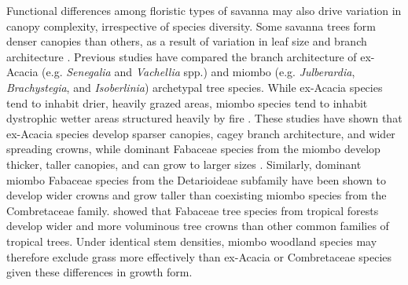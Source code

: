 \documentclass[11pt,a4paper]{article}
\begin{document}
Functional differences among floristic types of savanna may also drive variation in canopy complexity, irrespective of species diversity. Some savanna trees form denser canopies than others, as a result of variation in leaf size and branch architecture \citep{CharlesDominique2018}. Previous studies have compared the branch architecture of ex-Acacia (e.g. \textit{Senegalia} and \textit{Vachellia} spp.) and miombo (e.g. \textit{Julberardia}, \textit{Brachystegia}, and \textit{Isoberlinia}) archetypal tree species. While ex-Acacia species tend to inhabit drier, heavily grazed areas, miombo species tend to inhabit dystrophic wetter areas structured heavily by fire \citep{Ribeiro2020}. These studies have shown that ex-Acacia species develop sparser canopies, cagey branch architecture, and wider spreading crowns, while dominant Fabaceae species from the miombo develop thicker, taller canopies, and can grow to larger sizes \citep{Mugasha2013, Archibald2003, Privette2004}. Similarly, dominant miombo Fabaceae species from the Detarioideae subfamily have been shown to develop wider crowns and grow taller than coexisting miombo species from the Combretaceae family. \citet{Shenkin2020} showed that Fabaceae tree species from tropical forests develop wider and more voluminous tree crowns than other common families of tropical trees. Under identical stem densities, miombo woodland species may therefore exclude grass more effectively than ex-Acacia or Combretaceae species given these differences in growth form. 
\end{document}
